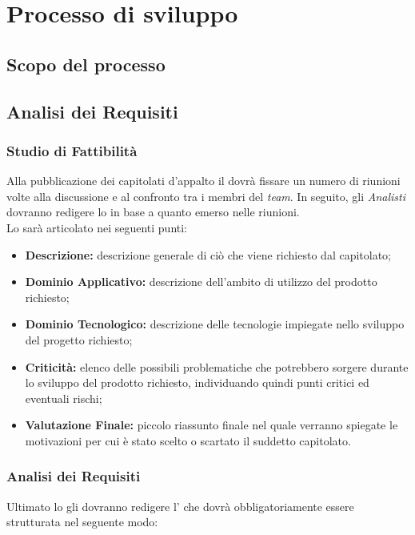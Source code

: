 \section{Processo di sviluppo}

\subsection{Scopo del processo}

\subsection{Analisi dei Requisiti}
\subsubsection{Studio di Fattibilità}
Alla pubblicazione dei capitolati d'appalto il \textit{\RdP} dovrà fissare un 
numero di riunioni volte alla discussione e al confronto tra i membri del \textit{team}. 
In seguito, gli \textit{Analisti} dovranno redigere lo \textit{\SdF} in base a quanto 
emerso nelle riunioni.\\
Lo \textit{\SdF} sarà articolato nei seguenti punti:
\begin{itemize}
  \item \textbf{Descrizione:} descrizione generale di ciò che viene richiesto 
  dal capitolato;
  \item \textbf{Dominio Applicativo:} descrizione dell'ambito di utilizzo del 
  prodotto richiesto;
  \item \textbf{Dominio Tecnologico:} descrizione delle tecnologie impiegate 
  nello sviluppo del progetto richiesto;
  \item \textbf{Criticità:} elenco delle possibili problematiche che potrebbero 
  sorgere durante lo sviluppo del prodotto richiesto, individuando quindi punti 
  critici ed eventuali rischi;
  \item \textbf{Valutazione Finale:} piccolo riassunto finale nel quale verranno 
  spiegate le motivazioni per cui è stato scelto o scartato il suddetto 
  capitolato.
\end{itemize}

\subsubsection{Analisi dei Requisiti}
Ultimato lo \textit{\SdF} gli \textit{\Anas} dovranno redigere l'\textit{\AdR} 
che dovrà obbligatoriamente essere strutturata nel seguente modo:

